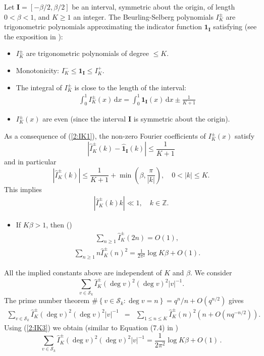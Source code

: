 \documentclass[12pt]{amsart}
\theoremstyle{plain}
\begin{document}
Let ${{\mathbf I}}=[-\beta/2,\beta/2]$ be an interval, symmetric about the origin, of length $0<\beta<1$, and $K \ge 1$ an integer. The Beurling-Selberg polynomials $I^{\pm}_K$ are trigonometric polynomials approximating the indicator function $\mathbf{1}_{{\mathbf I}}$ satisfying (see the exposition in \cite[Chapter 1.2]{mon}): \begin{itemize}
\item $I^{\pm}_K$ are trigonometric polynomials of degree $\le K$.

\item Monotonicity: $I^{-}_K \le \mathbf{1}_{{\mathbf I}} \le I^{+}_K$.

\item The integral of $I^{\pm}_K$ is close to the length of the interval:
    \begin{eqnarray} \label{2:IK1} \int_0^1 I^{\pm}_K(x) \, {\mathrm{d}} x = \int_0^1 \mathbf{1}_{{\mathbf I}}(x) \, {\mathrm{d}} x \pm \frac{1}{K+1}\end{eqnarray}

\item $I^{\pm}_K(x)$ are even (since the interval ${{\mathbf I}}$ is symmetric about the origin).
    \end{itemize}
As a consequence of (\ref{2:IK1}), the non-zero Fourier coefficients of $I^{\pm}_K(x)$ satisfy
\[\left|\widehat{I}^{\pm}_K(k) - \widehat{\mathbf{1}}_{{\mathbf I}}(k)\right| \le \frac{1}{K+1}\]
and in particular
\[\left|\widehat{I}^{\pm}_K(k)\right| \le \frac{1}{K+1}+ \min \left(\beta, \frac{\pi}{|k|}\right), \quad 0<|k| \le K. \]
This implies
\begin{eqnarray*} \left|\widehat{I}^{\pm}_K(k) k\right| \ll 1, \quad k \in {{\mathbb Z}}.
\end{eqnarray*}
\begin{itemize}
\item If $K\beta>1$, then (\cite[Propsition 4.1]{fai})
\begin{eqnarray*} \label{2:IK31} \sum_{n \ge 1}  \widehat{I}^{\pm}_K(2n)=O(1),\end{eqnarray*}
\begin{eqnarray} \label{2:IK3} \sum_{n \ge 1} n \widehat{I}^{\pm}_K(n)^2=\frac{1}{2 \pi^2} \log K\beta+O(1).\end{eqnarray}
\end{itemize}
All the implied constants above are independent of $K$ and $\beta$. We consider
\[\sum_{v \in {\mathcal{S}_k}} \widehat{I}^{\pm}_K(\deg v)^2 (\deg v)^2 |v|^{-1}.\]
The prime number theorem $\# \left\{v \in {\mathcal{S}_k}:\deg v=n\right\} =q^n/n+O\left(q^{n/2}\right)$ gives
\begin{eqnarray*} \sum_{v \in {\mathcal{S}_k}} \widehat{I}^{\pm}_K(\deg v)^2 (\deg v)^2 |v|^{-1}&=&\sum_{1 \le n \le K} \widehat{I}^{\pm}_K(n)^2 \left(n+O\left(nq^{-n/2}\right)\right). \end{eqnarray*}
Using (\ref{2:IK3}) we obtain (similar to Equation (7.4) in \cite{fai})
\[\sum_{v \in {\mathcal{S}_k}} \widehat{I}^{\pm}_K(\deg v)^2 (\deg v)^2 |v|^{-1}=\frac{1}{2 \pi^2} \log K\beta +O(1)\,. \]
\end{document}
